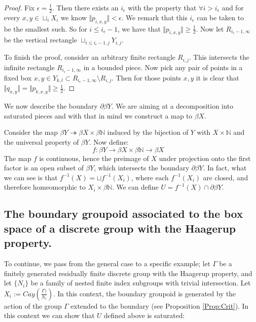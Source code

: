 \begin{example}
\begin{proof}
Fix $\epsilon = \frac{1}{2}$. Then there exists an $i_{\epsilon}$ with the property that $\forall i>i_{\epsilon}$ and for every $x,y \in \sqcup_{i}X_{i}$ we know $\Vert p_{i,x,y} \Vert < \epsilon$. We remark that this $i_{\epsilon}$ can be taken to be the smallest such. So for $i \leq i_{\epsilon}-1$, we have that $\Vert p_{i,x,y} \Vert \geq \frac{1}{2}$. Now let $R_{i_{\epsilon}-1,\infty}$ be the vertical rectangle $\sqcup_{i\leq i_{\epsilon}-1,j} Y_{i,j}$. 

To finish the proof, consider an arbitrary finite rectangle $R_{i,j}$. This intersects the infinite rectangle $R_{i_{\epsilon}-1,\infty}$ in a bounded piece. Now pick any pair of points in a fixed box $x,y \in Y_{k,l} \subset R_{i_{\epsilon}-1,\infty} \setminus R_{i,j}$. Then for those points $x,y$ it is clear that $\Vert q_{x,y} \Vert = \Vert p_{k,x,y}\Vert \geq \frac{1}{2}$.
\end{proof}

We now describe the boundary $\partial\beta Y$. We are aiming at a decomposition into saturated pieces and with that in mind we construct a map to $\beta X$.

Consider the map $\beta Y \twoheadrightarrow \beta X \times \beta \mathbb{N}$ induced by the bijection of $Y$ with $X \times \mathbb{N}$ and the universal property of $\beta Y$. Now define:
\begin{equation*}
f: \beta Y \rightarrow \beta X \times \beta \mathbb{N} \rightarrow \beta X
\end{equation*}
The map $f$ is continuous, hence the preimage of $X$ under projection onto the first factor is an open subset of $\beta Y$, which intersects the boundary $\partial \beta Y$. In fact, what we can see is that $f^{-1}(X)= \sqcup f^{-1}(X_{i})$, where each $f^{-1}(X_{i})$ are closed, and therefore homeomorphic to $X_{i} \times \beta \mathbb{N}$. We can define $U = f^{-1}(X)\cap \partial\beta Y$.

\subsection{The boundary groupoid associated to the box space of a discrete group with the Haagerup property.}

To continue, we pass from the general case to a specific example; let $\Gamma$ be a finitely generated residually finite discrete group with the Haagerup property, and let $\lbrace N_{i}\rbrace$ be a family of nested finite index subgroups with trivial intersection. Let $X_{i}:=Cay(\frac{\Gamma)}{N_{i}})$. In this context, the boundary groupoid is generated by the action of the group $\Gamma$ extended to the boundary (see Proposition \ref{Prop:Crit}). In this context we can show that $U$ defined above is saturated:


\end{example}
